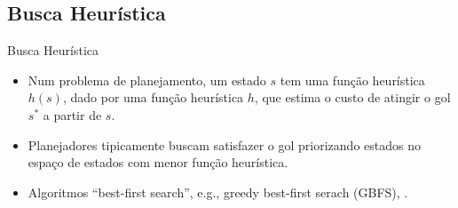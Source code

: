 \documentclass{beamer}
\begin{document}
\subsection{Busca Heurística}
\begin{frame}{Busca Heurística}
\begin{itemize}
  \item Num problema de planejamento, um estado $s$ tem uma função heurística $h(s)$, dado por uma função heurística $h$, que estima o \alert{custo de atingir o gol $s^{*}$} a partir de $s$.
  \pause
  \item Planejadores tipicamente buscam satisfazer o gol \alert{priorizando} estados no espaço de estados com \alert{menor função heurística}.
  \pause
  \item Algoritmos ``best-first search'', e.g., greedy best-first serach (GBFS), \astar.
\end{itemize}
\end{frame}
\end{document}
